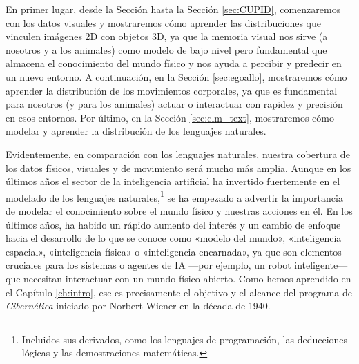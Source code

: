 \documentclass[../../book-main_es.tex]{subfiles}
\begin{document}
En primer lugar, desde la Sección  hasta
la Sección \ref{sec:CUPID}, comenzaremos con los datos visuales y mostraremos cómo
aprender las distribuciones que vinculen imágenes 2D con objetos 3D, ya que la memoria visual
nos sirve (a nosotros y a los animales) como modelo de bajo nivel pero fundamental que almacena
el conocimiento del mundo físico y nos ayuda
a percibir y predecir en un nuevo entorno. A continuación, en la Sección
\ref{sec:egoallo}, mostraremos cómo aprender la distribución de los movimientos corporales,
ya que es fundamental para nosotros (y para los animales) actuar o interactuar con rapidez y
precisión en esos entornos. Por último, en la Sección
\ref{sec:clm_text}, mostraremos cómo modelar y aprender la
distribución de los lenguajes naturales.

Evidentemente, en comparación con los lenguajes naturales, nuestra cobertura de
los datos físicos, visuales y de movimiento será mucho más amplia.
Aunque en los últimos años el sector de la inteligencia artificial ha invertido fuertemente en el modelado de 
los lenguajes naturales,\footnote{Incluidos sus derivados, como los lenguajes de programación, las deducciones lógicas y 
las demostraciones matemáticas.} se ha empezado a advertir la importancia de modelar el conocimiento sobre el 
mundo físico y nuestras acciones en él. En los últimos años, ha habido un rápido aumento del interés y un cambio de enfoque 
hacia el desarrollo de lo que se conoce como «modelo del mundo», «inteligencia espacial», «inteligencia física» o 
«inteligencia encarnada», ya que son elementos cruciales para los sistemas o agentes de IA ---por ejemplo, un robot 
inteligente--- que necesitan interactuar con un mundo físico abierto. Como hemos aprendido en el Capítulo \ref{ch:intro}, 
ese es precisamente el objetivo y el alcance del programa de {\em  Cibernética} iniciado por Norbert Wiener en la década de 1940.
\end{document}
